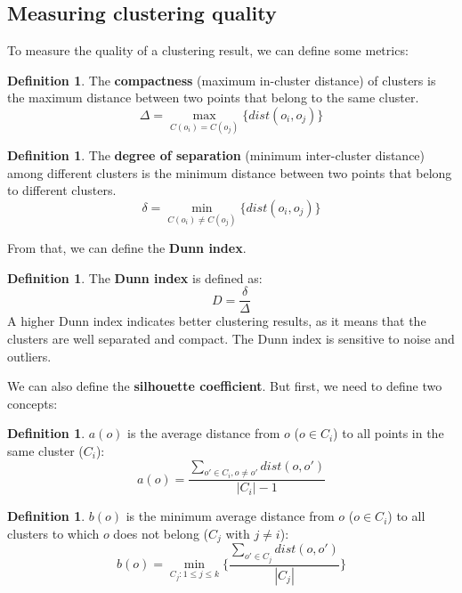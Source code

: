 \documentclass[12pt, openany]{report}
\theoremstyle{definition}
\newtheorem{definition}[thm]{Definition}
\begin{document}
\subsection{Measuring clustering quality}
To measure the quality of a clustering result, we can define some metrics:
\begin{definition}
    The \textbf{compactness} (maximum in-cluster distance) of clusters is the maximum distance between two points that belong to the same cluster.
    \begin{equation}
        \Delta = \max_{C(o_i)=C(o_j)} \{dist(o_i, o_j)\}
    \end{equation}
\end{definition}
\begin{definition}
    The \textbf{degree of separation} (minimum inter-cluster distance) among different clusters is the minimum distance between two points that belong to different clusters.
    \begin{equation}
        \delta = \min_{C(o_i) \neq C(o_j)} \{dist(o_i, o_j)\}
    \end{equation}
\end{definition}
From that, we can define the \textbf{Dunn index}.
\begin{definition}
    The \textbf{Dunn index} is defined as:
    \begin{equation}
        D = \frac{\delta}{\Delta}
    \end{equation}
    A higher Dunn index indicates better clustering results, as it means that the clusters are well separated and compact. The Dunn index is sensitive to noise and outliers.
\end{definition}
We can also define the \textbf{silhouette coefficient}. But first, we need to define two concepts:
\begin{definition}
    $a(o)$ is the average distance from $o$ ($o \in C_i$) to all points in the same cluster ($C_i$):
    \begin{equation}
        a(o) = \frac{\sum_{o' \in C_i, o \neq o'} dist(o, o')}{|C_i| - 1}
    \end{equation}
\end{definition}
\begin{definition}
    $b(o)$ is the minimum average distance from $o$ ($o \in C_i$) to all clusters to which $o$ does not belong ($C_j$ with $j \neq i$):
    \begin{equation}
        b(o) = \min_{C_j: 1 \leq j \leq k} \{\frac{\sum_{o' \in C_j} dist(o, o')}{|C_j|} \}
    \end{equation}
\end{definition}
\end{document}
